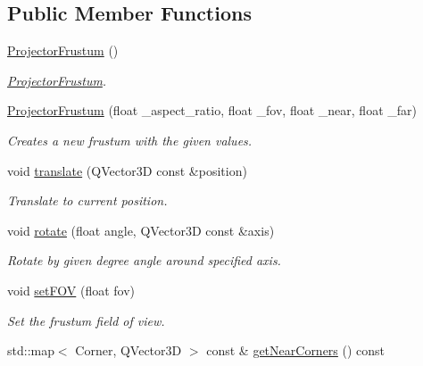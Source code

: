 \subsection*{Public Member Functions}
\begin{DoxyCompactItemize}
\item 
\mbox{\label{class_projector_frustum_aaddf578aae0115cd79ba29dc878ae545}} 
\mbox{\hyperlink{class_projector_frustum_aaddf578aae0115cd79ba29dc878ae545}{Projector\+Frustum}} ()
\begin{DoxyCompactList}\small\item\em \mbox{\hyperlink{class_projector_frustum}{Projector\+Frustum}}. \end{DoxyCompactList}\item 
\mbox{\hyperlink{class_projector_frustum_aac915f2a3a87868d11f0bb66a18342db}{Projector\+Frustum}} (float \+\_\+aspect\+\_\+ratio, float \+\_\+fov, float \+\_\+near, float \+\_\+far)
\begin{DoxyCompactList}\small\item\em Creates a new frustum with the given values. \end{DoxyCompactList}\item 
void \mbox{\hyperlink{class_projector_frustum_a1c5c97e807392f1e828c050ef17bcc92}{translate}} (Q\+Vector3D const \&position)
\begin{DoxyCompactList}\small\item\em Translate to current position. \end{DoxyCompactList}\item 
void \mbox{\hyperlink{class_projector_frustum_a31107a66549d2aed4c17a936989d2427}{rotate}} (float angle, Q\+Vector3D const \&axis)
\begin{DoxyCompactList}\small\item\em Rotate by given degree angle around specified axis. \end{DoxyCompactList}\item 
void \mbox{\hyperlink{class_projector_frustum_addd0f88dab59f47a2e66d8e08d438425}{set\+F\+OV}} (float fov)
\begin{DoxyCompactList}\small\item\em Set the frustum field of view. \end{DoxyCompactList}\item 
std\+::map$<$ Corner, Q\+Vector3D $>$ const  \& \mbox{\hyperlink{class_projector_frustum_a940f0000d14b46b8678b4c6910a18831}{get\+Near\+Corners}} () const

\end{DoxyCompactItemize}
